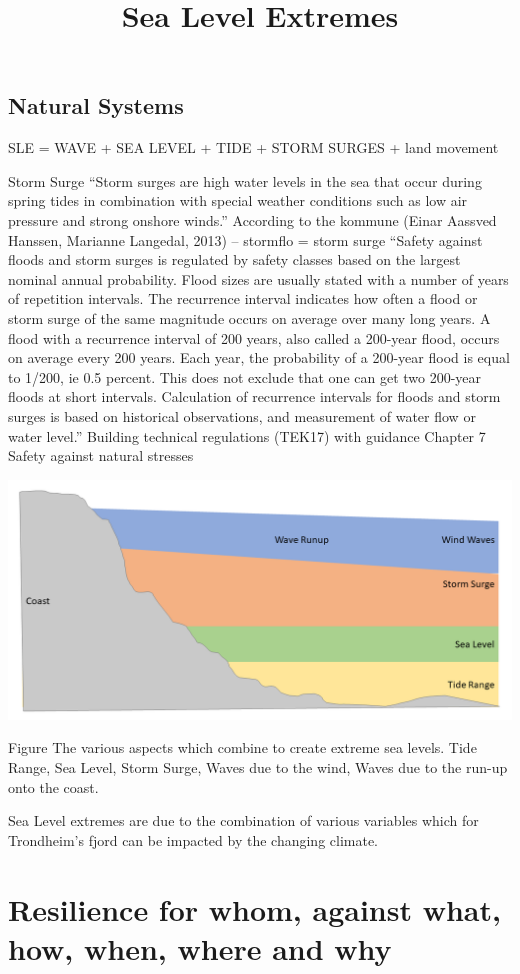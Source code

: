 \subsection{Natural Systems }
SLE = WAVE + SEA LEVEL + TIDE + STORM SURGES + land movement

Storm Surge
“Storm surges are high water levels in the sea that occur during spring tides in combination with special weather conditions such as low air pressure and strong onshore winds.” According to the kommune (Einar Aassved Hanssen, Marianne Langedal, 2013) – stormflo = storm surge
“Safety against floods and storm surges is regulated by safety classes based on the
largest nominal annual probability. Flood sizes are usually stated with a number of
years of repetition intervals. The recurrence interval indicates how often a flood or
storm surge of the same magnitude occurs on average over many long years. A flood
with a recurrence interval of 200 years, also called a 200-year flood, occurs on average
every 200 years. Each year, the probability of a 200-year flood is equal to 1/200, ie 0.5 percent.
This does not exclude that one can get two 200-year floods at short intervals.
Calculation of recurrence intervals for floods and storm surges is based on historical
observations, and measurement of water flow or water level.”
Building technical regulations (TEK17) with guidance Chapter 7 Safety against natural stresses

\title{Sea Level Extremes}
\includegraphics[width=1\textwidth]{fig_theory/sea level extremes.png}

\begin{frame}{Figure The various aspects which combine to create extreme sea levels. Tide Range, Sea Level, Storm Surge, Waves due to the wind, Waves due to the run-up onto the coast.}

Sea Level extremes are due to the combination of various variables which for Trondheim's fjord can be impacted by the changing climate. 

\section{Resilience for whom, against what, how, when, where and why}

\end{frame}



